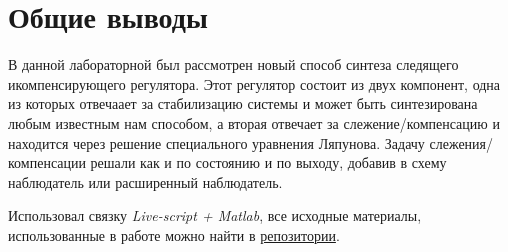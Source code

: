 \chapter{Общие выводы}
\label{ch:chap6}

В данной лабораторной был рассмотрен новый способ синтеза следящего икомпенсирующего регулятора. 
Этот регулятор состоит из двух компонент, одна из которых отвечаает за стабилизацию системы и может быть синтезирована любым известным нам способом, а вторая
отвечает за слежение/компенсацию и находится через решение специального уравнения Ляпунова.
Задачу слежения/компенсации решали как и по состоянию и по выходу, добавив в схему наблюдатель или расширенный наблюдатель.

Использовал связку \textit{Live-script + Matlab}, все исходные материалы, использованные в работе можно найти  в \href{https://github.com/GreedlyCore/control_theory_course}{репозитории}.

\endinput